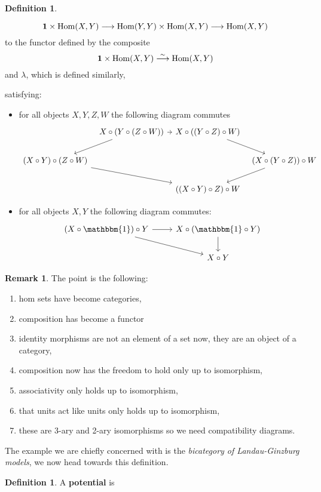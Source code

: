 \documentclass[12pt]{article}
\theoremstyle{plain}
\theoremstyle{definition}
\newtheorem{defn}[thm]{Definition} %
\newtheorem{remark}[thm]{Remark}
\newcommand{\lto}{\longrightarrow}
\begin{document}
\begin{defn}
\begin{itemize}
\begin{equation}
\bold{1} \times \operatorname{Hom}(X,Y) \lto \operatorname{Hom}(Y,Y) \times \operatorname{Hom}(X,Y) \lto \operatorname{Hom}(X,Y)
\end{equation}
to the functor defined by the composite
\begin{equation}
\bold{1} \times \operatorname{Hom}(X,Y) \stackrel{\sim}{\lto} \operatorname{Hom}(X,Y)
\end{equation}
and $\lambda$, which is defined similarly,
\end{itemize}
satisfying:
\begin{itemize}
\item for all objects $X,Y,Z,W$ the following diagram commutes
\begin{equation}
\begin{tikzcd}[column sep = tiny]
& X \circ (Y \circ (Z \circ W))\arrow[r]\arrow[dl]  & X \circ ((Y \circ Z) \circ W)\arrow[dr] \\
(X \circ Y) \circ (Z \circ W)\arrow[drr]& & & (X \circ (Y \circ Z)) \circ W\arrow[dl]\\
& & ((X \circ Y) \circ Z) \circ W
\end{tikzcd}
\end{equation}
\item for all objects $X,Y$ the following diagram commutes:
\begin{equation}
\begin{tikzcd}
(X \circ \mathbbm{1}) \circ Y\arrow[r]\arrow[dr] & X \circ (\mathbbm{1} \circ Y)\arrow[d]\\
& X \circ Y
\end{tikzcd}
\end{equation}
\end{itemize}

\end{defn}
\begin{remark}
The point is the following:
\begin{enumerate}
\item hom sets have become categories,
\item composition has become a functor
\item identity morphisms are not an element of a set now,  they are an object of a category,
\item composition now has the freedom to hold only up to isomorphism,
\item associativity only holds up to isomorphism,
\item that units act like units only holds up to isomorphism,
\item these are 3-ary and 2-ary isomorphisms so we need compatibility diagrams.
\end{enumerate}
\end{remark}
The example we are chiefly concerned with is the \emph{bicategory of Landau-Ginzburg models}, we now head towards this definition.
\begin{defn}
A \textbf{potential} is 
\end{defn}
\end{document}
